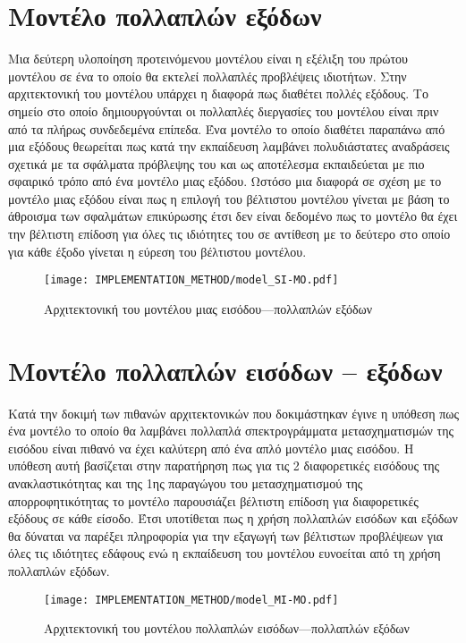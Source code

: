 \section{Μοντέλο πολλαπλών εξόδων}
Μια δεύτερη υλοποίηση προτεινόμενου μοντέλου είναι η εξέλιξη του πρώτου μοντέλου σε ένα το οποίο θα εκτελεί πολλαπλές προβλέψεις ιδιοτήτων. Στην αρχιτεκτονική του μοντέλου υπάρχει η διαφορά πως διαθέτει πολλές εξόδους. Το σημείο στο οποίο δημιουργούνται οι πολλαπλές διεργασίες του μοντέλου είναι πριν από τα πλήρως συνδεδεμένα επίπεδα. Ένα μοντέλο το οποίο διαθέτει παραπάνω από μια εξόδους θεωρείται πως κατά την εκπαίδευση λαμβάνει πολυδιάστατες αναδράσεις σχετικά με τα σφάλματα πρόβλεψης του και ως αποτέλεσμα εκπαιδεύεται με πιο σφαιρικό τρόπο από ένα μοντέλο μιας εξόδου. Ωστόσο μια διαφορά σε σχέση με το μοντέλο μιας εξόδου είναι πως η επιλογή του βέλτιστου μοντέλου γίνεται με βάση το άθροισμα των σφαλμάτων επικύρωσης έτσι δεν είναι δεδομένο πως το μοντέλο θα έχει την βέλτιστη επίδοση για όλες τις ιδιότητες του σε αντίθεση με το δεύτερο στο οποίο για κάθε έξοδο γίνεται η εύρεση του βέλτιστου μοντέλου.

\begin{figure}[H]
  \begin{center}
    \texttt{[image: IMPLEMENTATION\_METHOD/model\_SI-MO.pdf]}
    \caption{Αρχιτεκτονική του μοντέλου μιας εισόδου---πολλαπλών εξόδων}
  \end{center}
\end{figure}

\section{Μοντέλο πολλαπλών εισόδων -- εξόδων}
Κατά την δοκιμή των πιθανών αρχιτεκτονικών που δοκιμάστηκαν έγινε η υπόθεση πως ένα μοντέλο το οποίο θα λαμβάνει πολλαπλά σπεκτρογράμματα μετασχηματισμών της εισόδου είναι πιθανό να έχει καλύτερη από ένα απλό μοντέλο μιας εισόδου. Η υπόθεση αυτή βασίζεται στην παρατήρηση πως για τις 2 διαφορετικές εισόδους της ανακλαστικότητας και της 1ης παραγώγου του μετασχηματισμού   της απορροφητικότητας το μοντέλο παρουσιάζει βέλτιστη επίδοση για διαφορετικές εξόδους σε κάθε είσοδο. Έτσι υποτίθεται πως η χρήση πολλαπλών εισόδων και εξόδων θα δύναται να παρέξει πληροφορία για την εξαγωγή των βέλτιστων προβλέψεων για όλες τις ιδιότητες εδάφους ενώ η εκπαίδευση του μοντέλου ευνοείται από τη χρήση πολλαπλών εξόδων.

\begin{figure}[H]
  \begin{center}
    \texttt{[image: IMPLEMENTATION\_METHOD/model\_MI-MO.pdf]}
    \caption{Αρχιτεκτονική του μοντέλου πολλαπλών εισόδων---πολλαπλών εξόδων}
  \end{center}
\end{figure}

